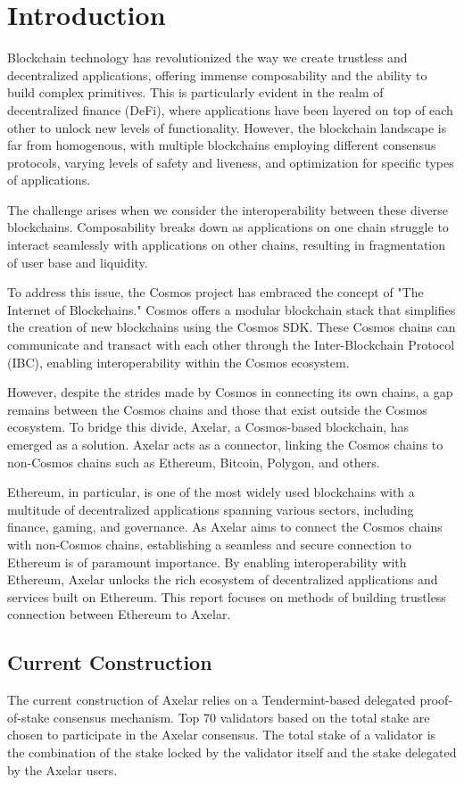 \section{Introduction}
Blockchain technology has revolutionized the way we create trustless and decentralized applications, offering immense composability and the ability to build complex primitives. This is particularly evident in the realm of decentralized finance (DeFi), where applications have been layered on top of each other to unlock new levels of functionality. However, the blockchain landscape is far from homogenous, with multiple blockchains employing different consensus protocols, varying levels of safety and liveness, and optimization for specific types of applications.

The challenge arises when we consider the interoperability between these diverse blockchains. Composability breaks down as applications on one chain struggle to interact seamlessly with applications on other chains, resulting in fragmentation of user base and liquidity.

To address this issue, the Cosmos project has embraced the concept of "The Internet of Blockchains." Cosmos offers a modular blockchain stack that simplifies the creation of new blockchains using the Cosmos SDK. These Cosmos chains can communicate and transact with each other through the Inter-Blockchain Protocol (IBC), enabling interoperability within the Cosmos ecosystem.

However, despite the strides made by Cosmos in connecting its own chains, a gap remains between the Cosmos chains and those that exist outside the Cosmos ecosystem. To bridge this divide, Axelar, a Cosmos-based blockchain, has emerged as a solution. Axelar acts as a connector, linking the Cosmos chains to non-Cosmos chains such as Ethereum, Bitcoin, Polygon, and others.

Ethereum, in particular, is one of the most widely used blockchains with a multitude of decentralized applications spanning various sectors, including finance, gaming, and governance. As Axelar aims to connect the Cosmos chains with non-Cosmos chains, establishing a seamless and secure connection to Ethereum is of paramount importance. By enabling interoperability with Ethereum, Axelar unlocks the rich ecosystem of decentralized applications and services built on Ethereum. This report focuses on methods of building trustless connection between Ethereum to Axelar.

\subsection{Current Construction}
The current construction of Axelar relies on a Tendermint-based delegated proof-of-stake consensus mechanism. Top 70 validators based on the total stake are chosen to participate in the Axelar consensus. The total stake of a validator is the combination of the stake locked by the validator itself and the stake delegated by the Axelar users.


